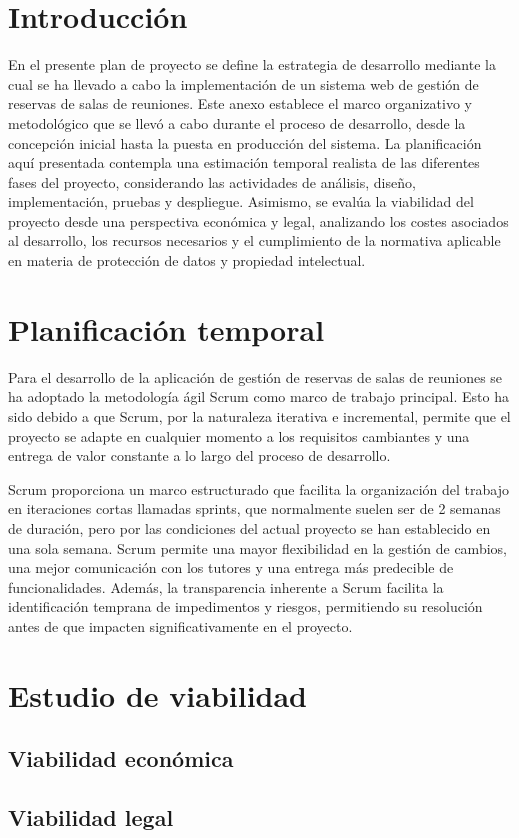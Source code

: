 
\section{Introducción}
En el presente plan de proyecto se define la estrategia de desarrollo mediante la cual se ha llevado a cabo la implementación de un sistema web de gestión de reservas de salas de reuniones. Este anexo establece el marco organizativo y metodológico que se llevó a cabo durante el proceso de desarrollo, desde la concepción inicial hasta la puesta en producción del sistema. La planificación aquí presentada contempla una estimación temporal realista de las diferentes fases del proyecto, considerando las actividades de análisis, diseño, implementación, pruebas y despliegue. Asimismo, se evalúa la viabilidad del proyecto desde una perspectiva económica y legal, analizando los costes asociados al desarrollo, los recursos necesarios y el cumplimiento de la normativa aplicable en materia de protección de datos y propiedad intelectual.

\section{Planificación temporal}
Para el desarrollo de la aplicación de gestión de reservas de salas de reuniones se ha adoptado la metodología ágil Scrum como marco de trabajo principal. Esto ha sido debido a que Scrum, por la naturaleza iterativa e incremental, permite que el proyecto se adapte en cualquier momento a los requisitos cambiantes y una entrega de valor constante a lo largo del proceso de desarrollo.

Scrum proporciona un marco estructurado que facilita la organización del trabajo en iteraciones cortas llamadas sprints, que normalmente suelen ser de 2 semanas de duración, pero por las condiciones del actual proyecto se han establecido en una sola semana. Scrum permite una mayor flexibilidad en la gestión de cambios, una mejor comunicación con los tutores y una entrega más predecible de funcionalidades. Además, la transparencia inherente a Scrum facilita la identificación temprana de impedimentos y riesgos, permitiendo su resolución antes de que impacten significativamente en el proyecto.

\section{Estudio de viabilidad}


\subsection{Viabilidad económica}


\subsection{Viabilidad legal}


